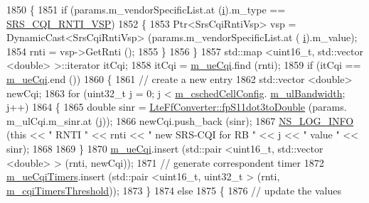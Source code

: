 \begin{DoxyCode}
1850           \{
1851             \textcolor{keywordflow}{if} (params.m\_vendorSpecificList.at (\hyperlink{bernuolliDistribution_8m_a6f6ccfcf58b31cb6412107d9d5281426}{i}).m\_type == \hyperlink{lte-vendor-specific-parameters_8h_a3b5e6e766032ab4a8e374a1cfd237a26}{SRS\_CQI\_RNTI\_VSP})
1852               \{
1853                 Ptr<SrsCqiRntiVsp> vsp = DynamicCast<SrsCqiRntiVsp> (params.m\_vendorSpecificList.at (
      \hyperlink{bernuolliDistribution_8m_a6f6ccfcf58b31cb6412107d9d5281426}{i}).m\_value);
1854                 rnti = vsp->GetRnti ();
1855               \}
1856           \}
1857         std::map <uint16\_t, std::vector <double> >::iterator itCqi;
1858         itCqi = \hyperlink{classns3_1_1TdMtFfMacScheduler_a586af40d969e8daa42c28b96a67b5854}{m\_ueCqi}.find (rnti);
1859         \textcolor{keywordflow}{if} (itCqi == \hyperlink{classns3_1_1TdMtFfMacScheduler_a586af40d969e8daa42c28b96a67b5854}{m\_ueCqi}.end ())
1860           \{
1861             \textcolor{comment}{// create a new entry}
1862             std::vector <double> newCqi;
1863             \textcolor{keywordflow}{for} (uint32\_t j = 0; j < \hyperlink{classns3_1_1TdMtFfMacScheduler_a585412f686e33f49dad1003e5d2216f0}{m\_cschedCellConfig}.
      \hyperlink{structns3_1_1FfMacCschedSapProvider_1_1CschedCellConfigReqParameters_a5ab5b102878e6e7e7727a14af4a64d2f}{m\_ulBandwidth}; j++)
1864               \{
1865                 \textcolor{keywordtype}{double} sinr = \hyperlink{classns3_1_1LteFfConverter_aa5d8c2a8f988dbd63da91818c18666eb}{LteFfConverter::fpS11dot3toDouble} (params.
      m\_ulCqi.m\_sinr.at (j));
1866                 newCqi.push\_back (sinr);
1867                 \hyperlink{group__logging_gafbd73ee2cf9f26b319f49086d8e860fb}{NS\_LOG\_INFO} (\textcolor{keyword}{this} << \textcolor{stringliteral}{" RNTI "} << rnti << \textcolor{stringliteral}{" new SRS-CQI for RB  "} << j << \textcolor{stringliteral}{" value
       "} << sinr);
1868 
1869               \}
1870             \hyperlink{classns3_1_1TdMtFfMacScheduler_a586af40d969e8daa42c28b96a67b5854}{m\_ueCqi}.insert (std::pair <uint16\_t, std::vector <double> > (rnti, newCqi));
1871             \textcolor{comment}{// generate correspondent timer}
1872             \hyperlink{classns3_1_1TdMtFfMacScheduler_a6a60cf28e7170cd2fac6402b804827cb}{m\_ueCqiTimers}.insert (std::pair <uint16\_t, uint32\_t > (rnti, 
      \hyperlink{classns3_1_1TdMtFfMacScheduler_a63ad2273332391bf152913fe2dbfa186}{m\_cqiTimersThreshold}));
1873           \}
1874         \textcolor{keywordflow}{else}
1875           \{
1876             \textcolor{comment}{// update the values}

\end{DoxyCode}

